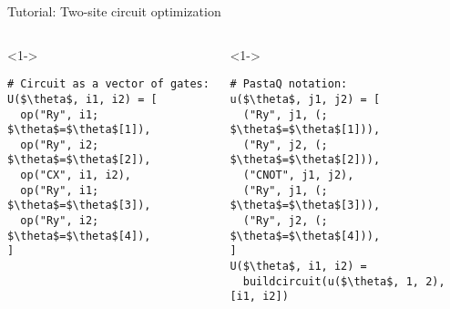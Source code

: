 \begin{frame}[fragile]{Tutorial: Two-site circuit optimization}


\begin{columns}

\begin{column}{5cm}

\begin{onlyenv}<1->

\begin{lstlisting}[language=JuliaLocal, style=julia, mathescape, basicstyle=\small]
# Circuit as a vector of gates:
U($\theta$, i1, i2) = [
  op("Ry", i1; $\theta$=$\theta$[1]),
  op("Ry", i2; $\theta$=$\theta$[2]),
  op("CX", i1, i2),
  op("Ry", i1; $\theta$=$\theta$[3]),
  op("Ry", i2; $\theta$=$\theta$[4]),
]


 \end{lstlisting}

\end{onlyenv}


\end{column}

\begin{column}{5cm}

\begin{onlyenv}<1->

\begin{lstlisting}[language=JuliaLocal, style=julia, numbers=none, mathescape, basicstyle=\small]
# PastaQ notation:
u($\theta$, j1, j2) = [
  ("Ry", j1, (; $\theta$=$\theta$[1])),
  ("Ry", j2, (; $\theta$=$\theta$[2])),
  ("CNOT", j1, j2),
  ("Ry", j1, (; $\theta$=$\theta$[3])),
  ("Ry", j2, (; $\theta$=$\theta$[4])),
]
U($\theta$, i1, i2) =
  buildcircuit(u($\theta$, 1, 2), [i1, i2])
\end{lstlisting}

\end{onlyenv}


\end{column}

\end{columns}

\end{frame}
